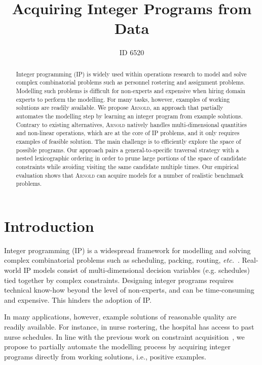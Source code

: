 \documentclass{article}
\title{Acquiring Integer Programs from Data}
\author{ID 6520}
\newcommand{\luc}[1]{{\bf \textcolor{red}{{Luc: #1}}}}
\newcommand{\learner}{\textsc{Arnold}\xspace}
\renewcommand\[{\begin{equation}}
\renewcommand\]{\end{equation}}
\begin{document}
\maketitle


\begin{abstract}
    Integer programming (IP) is widely used within operations research to model
    and solve complex combinatorial problems such as personnel rostering and
    assignment problems.  Modelling such problems is difficult for non-experts
    and expensive when hiring domain experts to perform the modelling.  For
    many tasks, however, examples of working solutions are readily available.
    We propose \learner, an approach that partially automates the modelling
    step by learning an integer program from example solutions.  Contrary to
    existing alternatives, \learner natively handles multi-dimensional
    quantities and non-linear operations, which are at the core of IP problems,
    and it only requires  examples of feasible solution.  The main challenge is
    to efficiently explore the space of possible programs.  Our approach pairs
    a general-to-specific traversal strategy with a nested lexicographic
    ordering in order to prune large portions of the space of candidate
    constraints while avoiding visiting the same candidate multiple times.  Our
    empirical evaluation shows that \learner can acquire models for a number of
    realistic benchmark problems.
\end{abstract}


\section{Introduction}
\label{sec:intro}

Integer programming (IP) is a widespread framework for modelling and solving
complex combinatorial problems such as scheduling, packing, routing,
\emph{etc.}~\cite{nemhauser1989integer}.  Real-world IP models consist of
multi-dimensional decision variables (e.g.  schedules) tied together by complex
constraints.
Designing integer programs requires technical know-how beyond the level of
non-experts, and can be time-consuming and expensive.  This hinders the
adoption of IP.

In many applications, however, example solutions of reasonable quality are
readily available.  For instance, in nurse rostering, the hospital has access
to past nurse schedules.  In line with the previous work on constraint
acquisition~\cite{de2018learning,bessiere2017constraint,beldiceanu2012model},
we propose to partially automate the modelling process by acquiring integer
programs directly from working solutions, i.e., positive examples.
\end{document}

